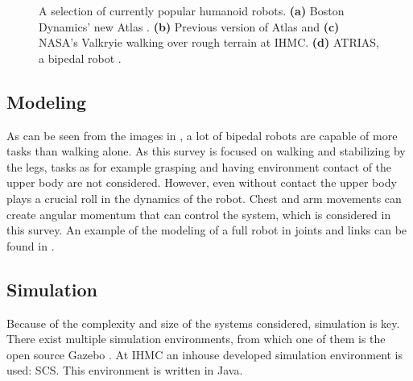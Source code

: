 \begin{figure}[h]
\begin{subfigure}{0.23\textwidth}
  \caption{}
   \label{fig:currentrobotsd}
  \end{subfigure}
  \caption{A selection of currently popular humanoid robots. \textbf{(a)} Boston Dynamics' new Atlas \cite{newatlas}. \textbf{(b)} Previous version of Atlas \cite{oldatlas} and \textbf{(c)} NASA's Valkryie \cite{valkyrie} walking over rough terrain at IHMC. \textbf{(d)} ATRIAS, a bipedal robot \cite{atrias}.}
  \label{fig:currentrobots}
\end{figure}
\subsection{Modeling}
As can be seen from the images in , a lot of bipedal robots are capable of more tasks than walking alone. As this survey is focused on walking and stabilizing by the legs, tasks as for example grasping and having environment contact of the upper body are not considered. However, even without contact the upper body plays a crucial roll in the dynamics of the robot. Chest and arm movements can create angular momentum that can control the system, which is considered in this survey. An example of the modeling of a full robot in joints and links can be found in \cite{yamaguchi1999development}.\\
\subsection{Simulation}
Because of the complexity and size of the systems considered, simulation is key. There exist multiple simulation environments, from which one of them is the open source Gazebo \cite{koenig2004design}. At IHMC an inhouse developed simulation environment is used: \ac{SCS}. This environment is written in Java.

